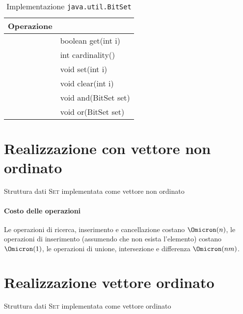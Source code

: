 \begin{table}[ht]
	\centering
	\caption{Implementazione \texttt{java.util.BitSet}}%
	\label{tab:java-set-implementation}
	\begin{tabular}{@{} l >{\ttfamily}l @{}}
	\toprule
		Operazione & \normalfont{Metodo} \\
	\midrule
		\setContains & boolean get(int i) \\
		\setSize & int cardinality() \\
		\setInsert & void set(int i) \\
		\setRemove & void clear(int i) \\
		\setUnion & void and(BitSet set) \\
		\setIntersection & void or(BitSet set) \\
	\bottomrule
	\end{tabular}
\end{table}

\vspace{-10pt}
\section{Realizzazione con vettore non ordinato}

\begin{algorithm}[H]
	\caption[Struttura dati insieme implementata come vettore non ordinato]
	        {Struttura dati \textsc{Set} implementata come vettore non ordinato}
	
\end{algorithm}

\paragraph{Costo delle operazioni}
Le operazioni di ricerca, inserimento e cancellazione costano \(\Omicron(n)\), le operazioni di inserimento (assumendo che non esista l'elemento) costano \(\Omicron(1)\), le operazioni di unione, intersezione e differenza \(\Omicron(nm)\).

\clearpage
\section{Realizzazione vettore ordinato}

\begin{algorithm}[H]
	\caption*{Struttura dati \textsc{Set} implementata come vettore ordinato}
	
\end{algorithm}

